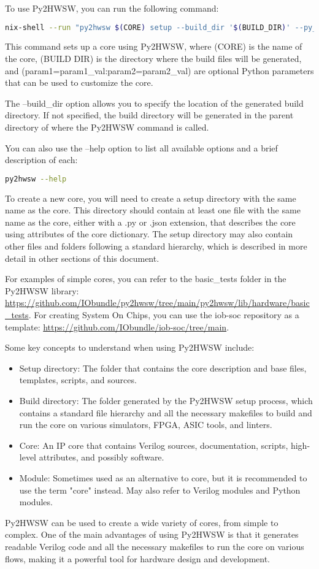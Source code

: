 %

To use Py2HWSW, you can run the following command:
\begin{lstlisting}[language=bash]
nix-shell --run "py2hwsw $(CORE) setup --build_dir '$(BUILD_DIR)' --py_params 'param1=param1_val:param2=param2_val"
\end{lstlisting}
This command sets up a core using Py2HWSW, where (CORE) is the name of the core, (BUILD DIR) is the directory where the build files will be generated, and (param1=param1\_val:param2=param2\_val) are optional Python parameters that can be used to customize the core.

The --build\_dir option allows you to specify the location of the generated build directory. If not specified, the build directory will be generated in the parent directory of where the Py2HWSW command is called.

You can also use the --help option to list all available options and a brief description of each:
\begin{lstlisting}[language=bash]
py2hwsw --help
\end{lstlisting}

To create a new core, you will need to create a setup directory with the same name as the core. This directory should contain at least one file with the same name as the core, either with a .py or .json extension, that describes the core using attributes of the core dictionary. The setup directory may also contain other files and folders following a standard hierarchy, which is described in more detail in other sections of this document.

For examples of simple cores, you can refer to the basic\_tests folder in the Py2HWSW library: \url{https://github.com/IObundle/py2hwsw/tree/main/py2hwsw/lib/hardware/basic_tests}. For creating System On Chips, you can use the iob-soc repository as a template: \url{https://github.com/IObundle/iob-soc/tree/main}.

Some key concepts to understand when using Py2HWSW include:

\begin{itemize}
  \item Setup directory: The folder that contains the core description and base files, templates, scripts, and sources.
  \item Build directory: The folder generated by the Py2HWSW setup process, which contains a standard file hierarchy and all the necessary makefiles to build and run the core on various simulators, FPGA, ASIC tools, and linters.
  \item Core: An IP core that contains Verilog sources, documentation, scripts, high-level attributes, and possibly software.
  \item Module: Sometimes used as an alternative to core, but it is recommended to use the term "core" instead. May also refer to Verilog modules and Python modules.
\end{itemize}

Py2HWSW can be used to create a wide variety of cores, from simple to complex. One of the main advantages of using Py2HWSW is that it generates readable Verilog code and all the necessary makefiles to run the core on various flows, making it a powerful tool for hardware design and development.
